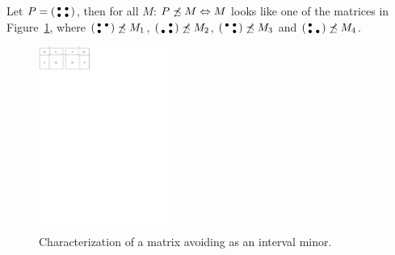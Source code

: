 \begin{thm}
\label{t33}
Let $P=\left(\begin{smallmatrix}\bullet&\bullet\\\bullet&\bullet\end{smallmatrix}\right)$, then for all $M$: $P\not\preceq M\Leftrightarrow M$ looks like one of the matrices in Figure~\ref{p33}, where $\left(\begin{smallmatrix}\bullet&\bullet\\\bullet& \end{smallmatrix}\right)\not\preceq M_1$, $\left(\begin{smallmatrix} &\bullet\\\bullet&\bullet\end{smallmatrix}\right)\not\preceq M_2$, $\left(\begin{smallmatrix}\bullet&\bullet\\ &\bullet\end{smallmatrix}\right)\not\preceq M_3$ and $\left(\begin{smallmatrix}\bullet& \\\bullet&\bullet\end{smallmatrix}\right)\not\preceq M_4$.
\end{thm}
\begin{figure}[!ht]
\centering
\includegraphics[height=60mm]{img/p33.pdf}
\caption{Characterization of a matrix avoiding \usebox{\smlmatb} as an interval minor.}
\label{p33}
\end{figure}
